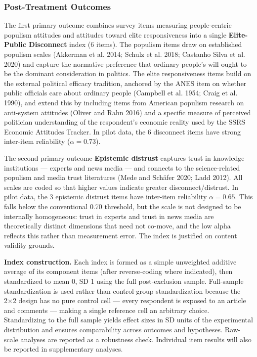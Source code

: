 \documentclass[
  12pt]{article}
\begin{document}
\subsubsection{Post-Treatment Outcomes}\label{post-treatment-outcomes}

The first primary outcome combines survey items measuring people-centric
populism attitudes and attitudes toward elite responsiveness into a
single \textbf{Elite-Public Disconnect} index (6 items). The populism
items draw on established populism scales (Akkerman et al. 2014; Schulz
et al. 2018; Castanho Silva et al. 2020) and capture the normative
preference that ordinary people's will ought to be the dominant
consideration in politics. The elite responsiveness items build on the
external political efficacy tradition, anchored by the ANES item on
whether public officials care about ordinary people (Campbell et al.
1954; Craig et al. 1990), and extend this by including items from
American populism research on anti-system attitudes (Oliver and Rahn
2016) and a specific measure of perceived politician understanding of
the respondent's economic reality used by the SSRS Economic Attitudes
Tracker. In pilot data, the 6 disconnect items have strong inter-item
reliability (\(\alpha = 0.73\)).

The second primary outcome \textbf{Epistemic distrust} captures trust in
knowledge institutions --- experts and news media --- and connects to
the science-related populism and media trust literatures (Mede and
Schäfer 2020; Ladd 2012). All scales are coded so that higher values
indicate greater disconnect/distrust. In pilot data, the 3 epistemic
distrust items have inter-item reliability \(\alpha = 0.65\). This falls
below the conventional 0.70 threshold, but the scale is not designed to
be internally homogeneous: trust in experts and trust in news media are
theoretically distinct dimensions that need not co-move, and the low
alpha reflects this rather than measurement error. The index is
justified on content validity grounds.

\textbf{Index construction.} Each index is formed as a simple unweighted
additive average of its component items (after reverse-coding where
indicated), then standardized to mean 0, SD 1 using the full
post-exclusion sample. Full-sample standardization is used rather than
control-group standardization because the 2×2 design has no pure control
cell --- every respondent is exposed to an article and comments ---
making a single reference cell an arbitrary choice. Standardizing to the
full sample yields effect sizes in SD units of the experimental
distribution and ensures comparability across outcomes and hypotheses.
Raw-scale analyses are reported as a robustness check. Individual item
results will also be reported in supplementary analyses.
\end{document}

